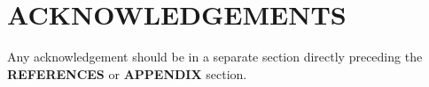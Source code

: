 \section{ACKNOWLEDGEMENTS}
Any acknowledgement should be in a separate section directly preceding
the \textbf{REFERENCES} or \textbf{APPENDIX} section.
